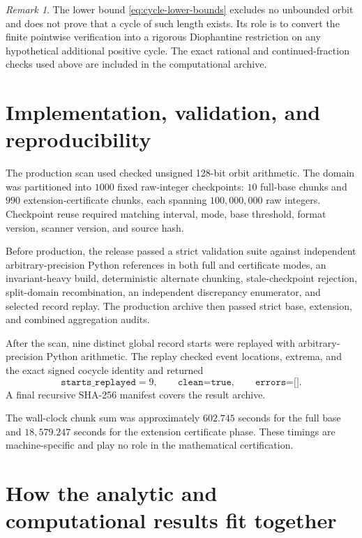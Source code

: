 \documentclass[11pt]{article}
\theoremstyle{definition}
\theoremstyle{remark}
\newtheorem{remark}[theorem]{Remark}
\begin{document}
\begin{remark}
The lower bound \eqref{eq:cycle-lower-bounds} excludes no unbounded orbit and does not prove that a cycle of such length exists.  Its role is to convert the finite pointwise verification into a rigorous Diophantine restriction on any hypothetical additional positive cycle.  The exact rational and continued-fraction checks used above are included in the computational archive.
\end{remark}

\section{Implementation, validation, and reproducibility}

The production scan used checked unsigned 128-bit orbit arithmetic.  The domain was partitioned into $1000$ fixed raw-integer checkpoints: $10$ full-base chunks and $990$ extension-certificate chunks, each spanning $100{,}000{,}000$ raw integers.  Checkpoint reuse required matching interval, mode, base threshold, format version, scanner version, and source hash.

Before production, the release passed a strict validation suite against independent arbitrary-precision Python references in both full and certificate modes, an invariant-heavy build, deterministic alternate chunking, stale-checkpoint rejection, split-domain recombination, an independent discrepancy enumerator, and selected record replay.  The production archive then passed strict base, extension, and combined aggregation audits.

After the scan, nine distinct global record starts were replayed with arbitrary-precision Python arithmetic.  The replay checked event locations, extrema, and the exact signed cocycle identity and returned
\[
\texttt{starts\_replayed}=9,\qquad
\texttt{clean=true},\qquad
\texttt{errors=[]}.
\]
A final recursive SHA-256 manifest covers the result archive.

The wall-clock chunk sum was approximately $602.745$ seconds for the full base and $18{,}579.247$ seconds for the extension certificate phase.  These timings are machine-specific and play no role in the mathematical certification.

\section{How the analytic and computational results fit together}
\end{document}
